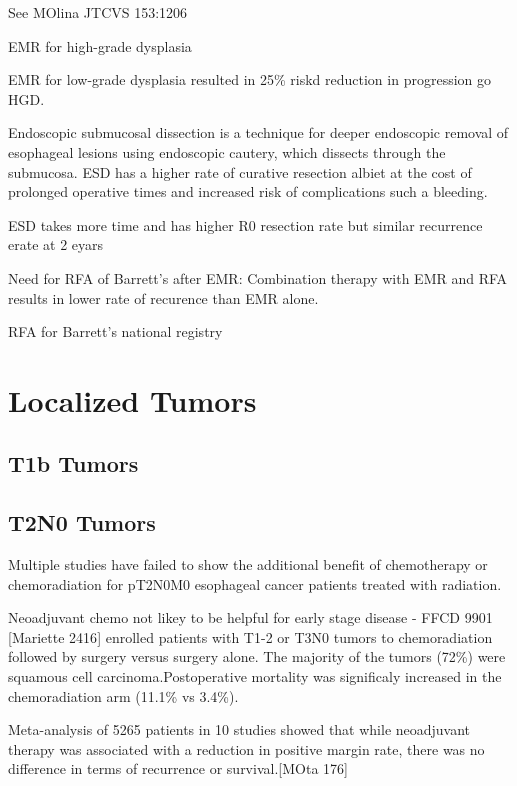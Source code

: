 \documentclass[
]{book}
\begin{document}
See MOlina JTCVS 153:1206

EMR for high-grade dysplasia \citep{shaheen2277}

EMR for low-grade dysplasia \citep{phoa1209} resulted in 25\% riskd reduction in progression go HGD.

Endoscopic submucosal dissection is a technique for deeper endoscopic removal of esophageal lesions using endoscopic cautery, which dissects through the submucosa. ESD has a higher rate of curative resection \citep{cao751} albiet at the cost of prolonged operative times and increased risk of complications such a bleeding. \citep{repici715}

ESD takes more time and has higher R0 resection rate but similar recurrence erate at 2 eyars \citep{terheggen783}

Need for RFA of Barrett's after EMR: \citep{haidry87} Combination therapy with EMR and RFA results in lower rate of recurence than EMR alone.\citep{pech1200}

RFA for Barrett's national registry \citep{ganz35}

\hypertarget{localized}{%
\chapter{Localized Tumors}\label{localized}}

\hypertarget{t1b-tumors}{%
\section{T1b Tumors}\label{t1b-tumors}}

\hypertarget{t2n0-tumors}{%
\section{T2N0 Tumors}\label{t2n0-tumors}}

Multiple studies have failed to show the additional benefit of chemotherapy or chemoradiation for pT2N0M0 esophageal cancer patients treated with radiation.

Neoadjuvant chemo not likey to be helpful for early stage disease - FFCD 9901 {[}Mariette 2416{]} enrolled patients with T1-2 or T3N0 tumors to chemoradiation followed by surgery versus surgery alone. The majority of the tumors (72\%) were squamous cell carcinoma.Postoperative mortality was significaly increased in the chemoradiation arm (11.1\% vs 3.4\%).

Meta-analysis of 5265 patients in 10 studies showed that while neoadjuvant therapy was associated with a reduction in positive margin rate, there was no difference in terms of recurrence or survival.{[}MOta 176{]}
\end{document}
